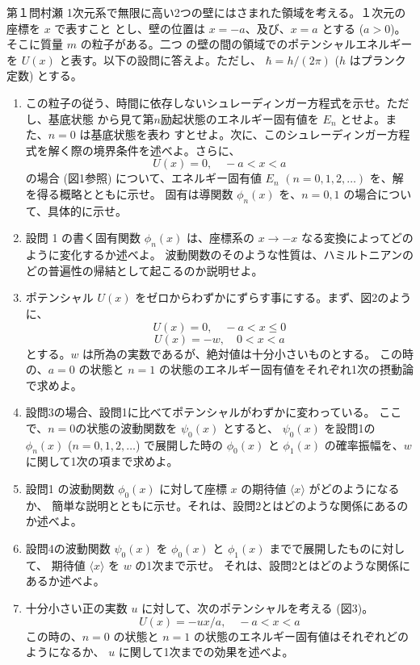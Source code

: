 \begin{question}{第１問}{村瀬}
1次元系で無限に高い2つの壁にはさまれた領域を考える。１次元の座標を $x$ で表すこと
とし、壁の位置は $x=-a$、及び、$x=a$ とする ($a>0$)。そこに質量 $m$ の粒子がある。二つ
の壁の間の領域でのポテンシャルエネルギーを $U(x)$ と表す。以下の設問に答えよ。ただし、
$\hbar=h/(2\pi)$ ($h$ はプランク定数) とする。
\begin{enumerate}
\item
この粒子の従う、時間に依存しないシュレーディンガー方程式を示せ。ただし、基底状態
から見て第$n$励起状態のエネルギー固有値を $E_n$ とせよ。また、$n=0$ は基底状態を表わ
すとせよ。次に、このシュレーディンガー方程式を解く際の境界条件を述べよ。さらに、
\begin{equation}
U(x)=0,\quad -a<x<a
\end{equation}
の場合 (図1参照) について、エネルギー固有値 $E_n$ $(n=0,1,2,\ldots)$ を、解を得る概略とともに示せ。
固有は導関数 $\phi_n(x)$ を、$n=0,1$ の場合について、具体的に示せ。
%
\item
設問 1 の書く固有関数 $\phi_n(x)$ は、座標系の $x\to-x$ なる変換によってどのように変化するか述べよ。
波動関数のそのような性質は、ハミルトニアンのどの普遍性の帰結として起こるのか説明せよ。
%
\item
ポテンシャル $U(x)$ をゼロからわずかにずらす事にする。まず、図2のように、
\begin{equation}
U(x)=0,\quad -a<x\le0
\end{equation}
\begin{equation}
U(x)=-w, \quad 0<x<a
\end{equation}
とする。$w$ は所為の実数であるが、絶対値は十分小さいものとする。
この時の、$a=0$ の状態と $n=1$ の状態のエネルギー固有値をそれぞれ1次の摂動論で求めよ。
%
\item
設問3の場合、設問1に比べてポテンシャルがわずかに変わっている。
ここで、$n=0$の状態の波動関数を $\psi_0(x)$ とすると、
$\psi_0(x)$ を設問1の $\phi_n(x)$ ($n=0,1,2,\ldots$) で展開した時の
$\phi_0(x)$ と $\phi_1(x)$ の確率振幅を、$w$ に関して1次の項まで求めよ。
%
\item
設問1 の波動関数 $\phi_0(x)$ に対して座標 $x$ の期待値 $\langle x\rangle$ がどのようになるか、
簡単な説明とともに示せ。それは、設問2とはどのような関係にあるのか述べよ。
%
\item
設問4の波動関数 $\psi_0(x)$ を $\phi_0(x)$ と $\phi_1(x)$ までで展開したものに対して、
期待値 $\langle x\rangle$ を $w$ の1次まで示せ。
それは、設問2とはどのような関係にあるか述べよ。
%
\item
十分小さい正の実数 $u$ に対して、次のポテンシャルを考える (図3)。
\begin{equation}
U(x)=-ux/a,\quad-a<x<a
\end{equation}
この時の、$n=0$ の状態と $n=1$ の状態のエネルギー固有値はそれぞれどのようになるか、
$u$ に関して1次までの効果を述べよ。
\end{enumerate}


\end{question}
